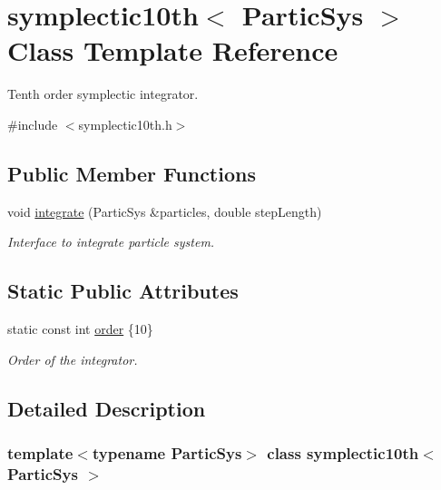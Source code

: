 \hypertarget{classsymplectic10th}{}\section{symplectic10th$<$ Partic\+Sys $>$ Class Template Reference}
\label{classsymplectic10th}


Tenth order symplectic integrator.  




{\ttfamily \#include $<$symplectic10th.\+h$>$}

\subsection*{Public Member Functions}
\begin{DoxyCompactItemize}
\item 
void \mbox{\hyperlink{classsymplectic10th_a6fd1d57c1504d7a603056ca021b179b0}{integrate}} (Partic\+Sys \&particles, double step\+Length)
\begin{DoxyCompactList}\small\item\em Interface to integrate particle system. \end{DoxyCompactList}\end{DoxyCompactItemize}
\subsection*{Static Public Attributes}
\begin{DoxyCompactItemize}
\item 
static const int \mbox{\hyperlink{classsymplectic10th_af1cb88e94e3022b5bf90091d03c609a4}{order}} \{10\}
\begin{DoxyCompactList}\small\item\em Order of the integrator. \end{DoxyCompactList}\end{DoxyCompactItemize}


\subsection{Detailed Description}
\subsubsection*{template$<$typename Partic\+Sys$>$\newline
class symplectic10th$<$ Partic\+Sys $>$}

